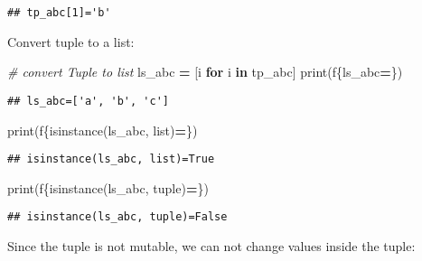 \documentclass[
]{book}
\newenvironment{Shaded}{\begin{snugshade}}{\end{snugshade}}
\newcommand{\BuiltInTok}[1]{#1}
\newcommand{\CommentTok}[1]{\textcolor[rgb]{0.56,0.35,0.01}{\textit{#1}}}
\newcommand{\ControlFlowTok}[1]{\textcolor[rgb]{0.13,0.29,0.53}{\textbf{#1}}}
\newcommand{\KeywordTok}[1]{\textcolor[rgb]{0.13,0.29,0.53}{\textbf{#1}}}
\newcommand{\NormalTok}[1]{#1}
\newcommand{\OperatorTok}[1]{\textcolor[rgb]{0.81,0.36,0.00}{\textbf{#1}}}
\newcommand{\SpecialCharTok}[1]{\textcolor[rgb]{0.00,0.00,0.00}{#1}}
\newcommand{\SpecialStringTok}[1]{\textcolor[rgb]{0.31,0.60,0.02}{#1}}
\begin{document}
\begin{verbatim}
## tp_abc[1]='b'
\end{verbatim}

Convert tuple to a list:

\begin{Shaded}
\begin{Highlighting}[]
\CommentTok{\# convert Tuple to list}
\NormalTok{ls\_abc }\OperatorTok{=}\NormalTok{ [i }\ControlFlowTok{for}\NormalTok{ i }\KeywordTok{in}\NormalTok{ tp\_abc]}
\BuiltInTok{print}\NormalTok{(}\SpecialStringTok{f\textquotesingle{}}\SpecialCharTok{\{}\NormalTok{ls\_abc}\OperatorTok{=}\SpecialCharTok{\}}\SpecialStringTok{\textquotesingle{}}\NormalTok{)}
\end{Highlighting}
\end{Shaded}

\begin{verbatim}
## ls_abc=['a', 'b', 'c']
\end{verbatim}

\begin{Shaded}
\begin{Highlighting}[]
\BuiltInTok{print}\NormalTok{(}\SpecialStringTok{f\textquotesingle{}}\SpecialCharTok{\{}\BuiltInTok{isinstance}\NormalTok{(ls\_abc, }\BuiltInTok{list}\NormalTok{)}\OperatorTok{=}\SpecialCharTok{\}}\SpecialStringTok{\textquotesingle{}}\NormalTok{)}
\end{Highlighting}
\end{Shaded}

\begin{verbatim}
## isinstance(ls_abc, list)=True
\end{verbatim}

\begin{Shaded}
\begin{Highlighting}[]
\BuiltInTok{print}\NormalTok{(}\SpecialStringTok{f\textquotesingle{}}\SpecialCharTok{\{}\BuiltInTok{isinstance}\NormalTok{(ls\_abc, }\BuiltInTok{tuple}\NormalTok{)}\OperatorTok{=}\SpecialCharTok{\}}\SpecialStringTok{\textquotesingle{}}\NormalTok{)}
\end{Highlighting}
\end{Shaded}

\begin{verbatim}
## isinstance(ls_abc, tuple)=False
\end{verbatim}

Since the tuple is not mutable, we can not change values inside the tuple:
\end{document}
